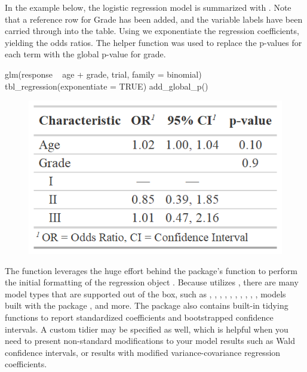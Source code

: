 In the example below, the logistic regression model is summarized with .
Note that a reference row for Grade has been added, and the variable labels have been carried through into the table.
Using   we exponentiate the regression coefficients, yielding the odds ratios.
The helper function  was used to replace the p-values for each term with the global p-value for grade.

\begin{example}
glm(response ~ age + grade, trial, family = binomial) %
  tbl_regression(exponentiate = TRUE) %
  add_global_p()
\end{example}

\begin{figure}[h!]
  \includegraphics[scale=0.49]{regression.png}
  \centering
\end{figure}

The  function leverages the huge effort behind the  package's  function to perform the initial formatting of the regression object \citep{broom}.
Because  utilizes , there are many model types that are supported out of the box, such as , , , , , , , , , , models built with the  package \citep{mice}, and more. The  package also contains built-in tidying functions to report standardized coefficients and bootstrapped confidence intervals.
A custom tidier may be specified as well, which is helpful when you need to present non-standard modifications to your model results such as Wald confidence intervals, or results with modified variance-covariance regression coefficients.

